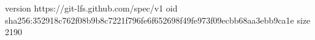 version https://git-lfs.github.com/spec/v1
oid sha256:352918c762f08b9b8c7221f796fe6f652698f49fe973f09ecbb68aa3ebb9ca1e
size 2190
